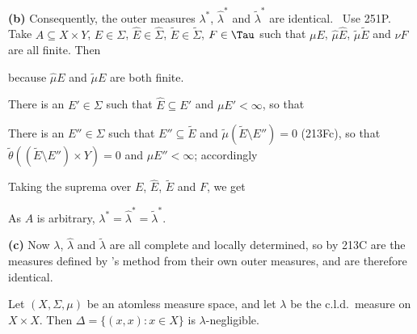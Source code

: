 {\medskip

{\bf (b)} Consequently, the outer measures $\lambda^*$, $\hat\lambda^*$
and $\tilde\lambda^*$ are identical.   \Prf\ Use 251P.   Take
$A\subseteq X\times Y$, $E\in\Sigma$, $\hat E\in\hat\Sigma$,
$\tilde E\in\tilde\Sigma$,
$F\in\Tau$ such that $\mu E$, $\hat\mu\hat E$, $\tilde\mu\tilde E$ and
$\nu F$ are all finite.   Then

\medskip



\noindent because $\hat\mu E$ and $\tilde\mu E$ are both finite.

\medskip

 There is an $E'\in\Sigma$ such that $\hat E\subseteq E'$
and $\mu E'<\infty$, so that


\medskip

 There is an $E''\in\Sigma$ such that
$E''\subseteq\tilde E$ and $\tilde\mu(\tilde E\setminus E'')=0$ (213Fc),
so that
$\tilde\theta((\tilde E\setminus E'')\times Y)=0$ and $\mu E''<\infty$;
accordingly


\medskip

 Taking the suprema over $E$, $\hat E$, $\tilde E$ and
$F$,
we get


\noindent As $A$ is arbitrary,
$\lambda^*=\hat\lambda^*=\tilde\lambda^*$.\ \Qed

\medskip

{\bf (c)} Now $\lambda$, $\hat\lambda$ and $\tilde\lambda$ are all
complete and locally determined, so by 213C are the measures
defined by
\Caratheodory's method from their own outer measures, and are therefore
identical.
}%

 Let $(X,\Sigma,\mu)$ be an atomless measure
space, and let $\lambda$ be the c.l.d.\ measure on $X\times X$.   Then
$\Delta=\{(x,x):x\in X\}$ is $\lambda$-negligible.

